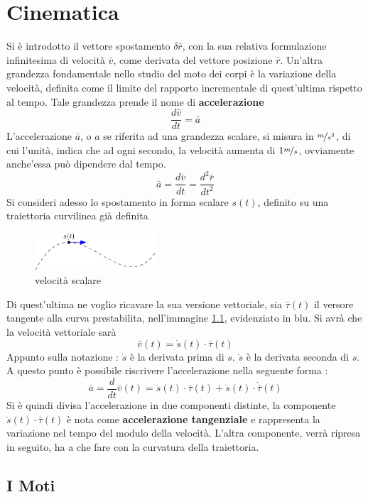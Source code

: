 \documentclass[10pt, letterpaper]{report}
\begin{document}
\chapter{Cinematica}
Si è introdotto il vettore spostamento $\delta \bar r$, con la sua relativa formulazione infinitesima 
di velocità $\bar v$, come derivata del vettore posizione $\bar r$. 
Un'altra grandezza fondamentale nello studio del moto dei corpi è la variazione della velocità, definita 
come il limite del rapporto incrementale di quest'ultima rispetto al tempo. 
Tale grandezza prende il nome di \textbf{accelerazione}
$$ \frac{d\bar v}{d t} = \bar a $$
L'accelerazione $\bar a$, o $a$ se riferita ad una grandezza scalare, si misura in 
$\nicefrac{m}{s^2}$, di cui l'unità, indica che ad ogni secondo, la velocità aumenta 
di $1 \nicefrac{m}{s}$, ovviamente anche'essa può dipendere dal tempo. 
$$\bar a=\frac{d\bar v}{dt}=\frac{d^2\bar r}{dt^2}$$
Si consideri adesso lo spostamento in forma scalare $s(t)$, definito su una traiettoria 
curvilinea già definita
\begin{center}
    \begin{figure}[h!]
        \centering
        \includegraphics[width=0.4\textwidth]{images/accScal.eps}
        \caption{velocità scalare}
        \label{fig:velScal}
    \end{figure} 
\end{center}
Di quest'ultima ne voglio ricavare la sua versione vettoriale, sia $\bar\tau(t)$ il versore 
tangente alla curva prestabilita, nell'immagine \ref{fig:velScal}, evidenziato in blu. 
Si avrà che la velocità vettoriale sarà 
$$ \bar v(t)=\dot{s}(t)\cdot \bar\tau(t)$$
Appunto sulla notazione :  $\dot{s}$ è la derivata prima di $s$. 
$\ddot{s}$ è la derivata seconda di $s$. A questo punto è possibile riscrivere 
l'accelerazione nella seguente forma :
$$
\bar a = \dfrac{d}{dt}\bar v(t)=\ddot{s}(t)\cdot \bar\tau(t)+\dot{s}(t)\cdot\dot{\bar\tau}(t)
$$
Si è quindi divisa l'accelerazione in due componenti distinte, la componente 
$\ddot{s}(t)\cdot \bar\tau(t)$ è nota come \textbf{accelerazione tangenziale} e rappresenta 
la variazione nel tempo del modulo della velocità. L'altra componente, verrà ripresa in seguito, 
ha a che fare con la curvatura della traiettoria.\acc 
\section{I Moti}
\end{document}
